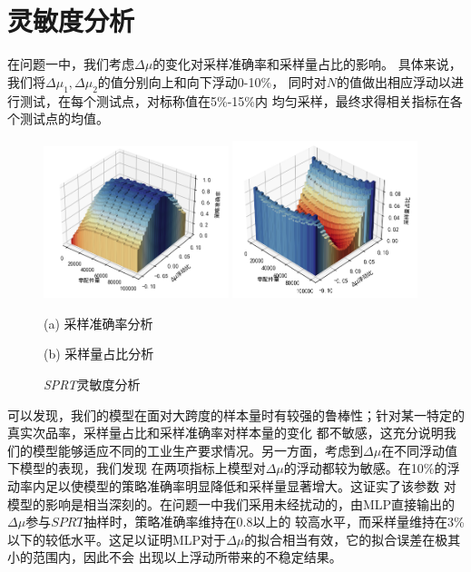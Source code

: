\documentclass[withoutpreface,bwprint]{cumcmthesis} %
\begin{document}
\section{灵敏度分析}
在问题一中，我们考虑$\Delta \mu$的变化对采样准确率和采样量占比的影响。
具体来说，
我们将$\Delta \mu_1,\Delta \mu_2$的值分别向上和向下浮动0-10\%，
同时对$N$的值做出相应浮动以进行测试，在每个测试点，对标称值在5\%-15\%内
均匀采样，最终求得相关指标在各个测试点的均值。
\begin{figure}[htbp]
	\centering
	\includegraphics[width=0.48\textwidth]{Fig/pro1_sensi_acc.png}
	\includegraphics[width=0.48\textwidth]{Fig/pro1_sensi_ocu.png}
	\begin{minipage}[b]{0.48\textwidth}
		\centering
		(a) 采样准确率分析
	\end{minipage}
	\begin{minipage}[b]{0.48\textwidth}
		\centering
		(b) 采样量占比分析
	\end{minipage}
	\caption{\textit{SPRT}灵敏度分析}
	\label{Pro1_sensi}
\end{figure}
可以发现，我们的模型在面对大跨度的样本量时有较强的鲁棒性；针对某一特定的真实次品率，采样量占比和采样准确率对样本量的变化
都不敏感，这充分说明我们的模型能够适应不同的工业生产要求情况。另一方面，考虑到$\Delta \mu$在不同浮动值下模型的表现，我们发现
在两项指标上模型对$\Delta \mu$的浮动都较为敏感。在10\%的浮动率内足以使模型的策略准确率明显降低和采样量显著增大。这证实了该参数
对模型的影响是相当深刻的。在问题一中我们采用未经扰动的，由MLP直接输出的$\Delta \mu$参与$SPRT$抽样时，策略准确率维持在0.8以上的
较高水平，而采样量维持在3\%以下的较低水平。这足以证明MLP对于$\Delta \mu$的拟合相当有效，它的拟合误差在极其小的范围内，因此不会
出现以上浮动所带来的不稳定结果。
\end{document}
